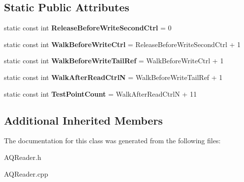 \subsection*{Static Public Attributes}
\begin{DoxyCompactItemize}
\item 
static const int {\bfseries Release\+Before\+Write\+Second\+Ctrl} = 0\hypertarget{class_a_q_reader_afc4fc5bc47126f689f250633e696b974}{}\label{class_a_q_reader_afc4fc5bc47126f689f250633e696b974}

\item 
static const int {\bfseries Walk\+Before\+Write\+Ctrl} = Release\+Before\+Write\+Second\+Ctrl + 1\hypertarget{class_a_q_reader_ad1bea8ce5f71051ab9e08a7082b5c47a}{}\label{class_a_q_reader_ad1bea8ce5f71051ab9e08a7082b5c47a}

\item 
static const int {\bfseries Walk\+Before\+Write\+Tail\+Ref} = Walk\+Before\+Write\+Ctrl + 1\hypertarget{class_a_q_reader_a49a0d882ae89a520a0c32ca407172e33}{}\label{class_a_q_reader_a49a0d882ae89a520a0c32ca407172e33}

\item 
static const int {\bfseries Walk\+After\+Read\+CtrlN} = Walk\+Before\+Write\+Tail\+Ref + 1\hypertarget{class_a_q_reader_a82f7a6e5151119edaddcd0ccc167547b}{}\label{class_a_q_reader_a82f7a6e5151119edaddcd0ccc167547b}

\item 
static const int {\bfseries Test\+Point\+Count} = Walk\+After\+Read\+CtrlN + 11\hypertarget{class_a_q_reader_a3d1f81f5acfd2b55b226d2545fc9d9f1}{}\label{class_a_q_reader_a3d1f81f5acfd2b55b226d2545fc9d9f1}

\end{DoxyCompactItemize}
\subsection*{Additional Inherited Members}


The documentation for this class was generated from the following files\+:\begin{DoxyCompactItemize}
\item 
A\+Q\+Reader.\+h\item 
A\+Q\+Reader.\+cpp\end{DoxyCompactItemize}
